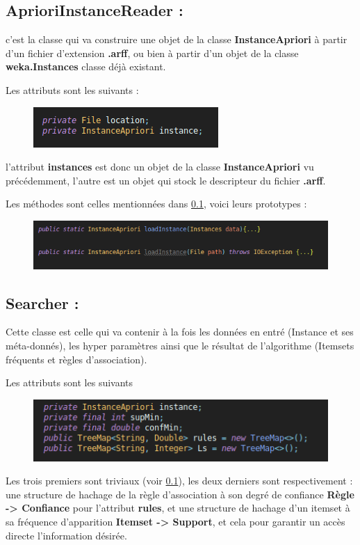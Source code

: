 			\subsection{AprioriInstanceReader :} \label{loader} c'est la classe qui va construire une objet de la classe \textbf{InstanceApriori} à partir d'un fichier d'extension \textbf{.arff}, ou bien à partir d'un objet de la classe \textbf{weka.Instances} classe déjà existant.
			\par Les attributs sont les suivants : 
			\begin{figure}[H]
				\centering
				\includegraphics[width=0.75\linewidth]{apriori/images/data_structs/laoder/properties.png}
			\end{figure}
			\par l'attribut \textbf{instances} est donc un objet de la classe \textbf{InstanceApriori} vu précédemment, l'autre est un objet qui stock le descripteur du fichier \textbf{.arff}.
			
			\par 
			Les méthodes sont celles mentionnées dans \ref{loader}, voici leurs prototypes :
			\begin{figure}[H]
				\centering
				\includegraphics[width=0.75\linewidth]{apriori/images/data_structs/laoder/methods.png}
			\end{figure}
			
			\subsection{Searcher :} 
			Cette classe est celle qui va contenir à la fois les données en entré (Instance et ses méta-donnés), les hyper paramètres ainsi que le résultat de l'algorithme (Itemsets fréquents et règles d'association).
			\par
			Les attributs sont les suivants 
			\begin{figure}[H]
				\centering
				\includegraphics[width=0.75\linewidth]{apriori/images/data_structs/searcher/props.png}
			\end{figure}
			\par Les trois premiers sont triviaux (voir \ref{loader}), les deux derniers sont respectivement : une structure de hachage de la règle d'association à son degré de confiance \textbf{Règle -> Confiance} pour l'attribut \textbf{rules}, et une structure de hachage d'un itemset à sa fréquence d'apparition \textbf{Itemset -> Support}, et cela pour garantir un accès directe l'information désirée.
			
